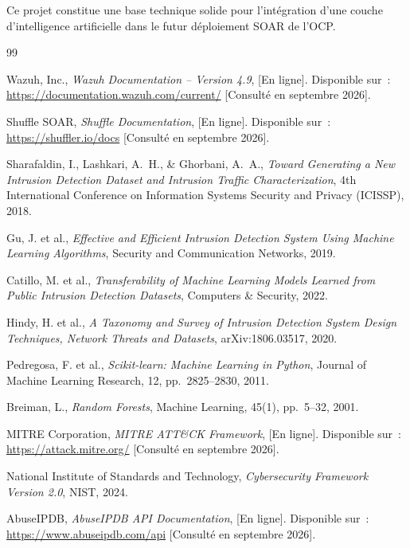 \documentclass[12pt,a4paper]{report}
\begin{document}
Ce projet constitue une base technique solide pour l'intégration d'une couche d'intelligence artificielle dans le futur déploiement SOAR de l'OCP.

\newpage
{}
\begin{thebibliography}{99}

Wazuh, Inc.,
\textit{Wazuh Documentation -- Version 4.9},
[En ligne]. Disponible sur~: \url{https://documentation.wazuh.com/current/}
[Consulté en septembre 2026].

Shuffle SOAR,
\textit{Shuffle Documentation},
[En ligne]. Disponible sur~: \url{https://shuffler.io/docs}
[Consulté en septembre 2026].

Sharafaldin, I., Lashkari, A.~H., \& Ghorbani, A.~A.,
\textit{Toward Generating a New Intrusion Detection Dataset
  and Intrusion Traffic Characterization},
4th International Conference on Information Systems
Security and Privacy (ICISSP), 2018.

Gu, J. et al.,
\textit{Effective and Efficient Intrusion Detection System Using Machine Learning Algorithms},
Security and Communication Networks, 2019.

Catillo, M. et al.,
\textit{Transferability of Machine Learning Models Learned from Public Intrusion Detection Datasets},
Computers \& Security, 2022.

Hindy, H. et al.,
\textit{A Taxonomy and Survey of Intrusion Detection System Design Techniques, Network Threats and Datasets},
arXiv:1806.03517, 2020.

Pedregosa, F. et al.,
\textit{Scikit-learn: Machine Learning in Python},
Journal of Machine Learning Research, 12, pp.~2825--2830, 2011.

Breiman, L.,
\textit{Random Forests},
Machine Learning, 45(1), pp.~5--32, 2001.

MITRE Corporation,
\textit{MITRE ATT\&CK Framework},
[En ligne]. Disponible sur~: \url{https://attack.mitre.org/}
[Consulté en septembre 2026].

National Institute of Standards and Technology,
\textit{Cybersecurity Framework Version 2.0},
NIST, 2024.

AbuseIPDB,
\textit{AbuseIPDB API Documentation},
[En ligne]. Disponible sur~: \url{https://www.abuseipdb.com/api}
[Consulté en septembre 2026].

\end{thebibliography}
\end{document}
